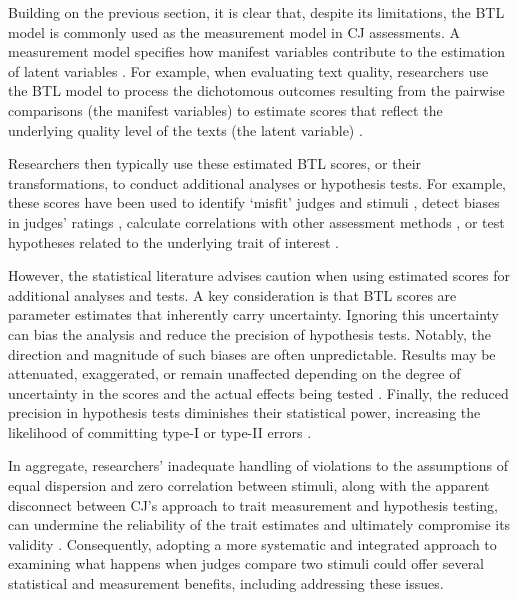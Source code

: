 \documentclass[
  authoryear,
  preprint,
  1p]{elsarticle}
\begin{document}
Building on the previous section, it is clear that, despite its
limitations, the BTL model is commonly used as the measurement model in
CJ assessments. A measurement model specifies how manifest variables
contribute to the estimation of latent variables
\citep{Everitt_et_al_2010}. For example, when evaluating text quality,
researchers use the BTL model to process the dichotomous outcomes
resulting from the pairwise comparisons (the manifest variables) to
estimate scores that reflect the underlying quality level of the texts
(the latent variable)
\citep{Laming_2004, Pollitt_2012b, Whitehouse_2012, vanDaal_et_al_2016, Lesterhuis_2018_thesis, Coertjens_et_al_2017, Goossens_et_al_2018, Bouwer_et_al_2023}.

Researchers then typically use these estimated BTL scores, or their
transformations, to conduct additional analyses or hypothesis tests. For
example, these scores have been used to identify `misfit' judges and
stimuli \citep{Pollitt_2012b, vanDaal_et_al_2016, Goossens_et_al_2018},
detect biases in judges' ratings
\citep{Pollitt_et_al_2003, Pollitt_2012b}, calculate correlations with
other assessment methods \citep{Goossens_et_al_2018, Bouwer_et_al_2023},
or test hypotheses related to the underlying trait of interest
\citep{Bramley_et_al_2019, Boonen_et_al_2020, Bouwer_et_al_2023, vanDaal_et_al_2017, Jones_et_al_2019, Gijsen_et_al_2021}.

However, the statistical literature advises caution when using estimated
scores for additional analyses and tests. A key consideration is that
BTL scores are parameter estimates that inherently carry uncertainty.
Ignoring this uncertainty can bias the analysis and reduce the precision
of hypothesis tests. Notably, the direction and magnitude of such biases
are often unpredictable. Results may be attenuated, exaggerated, or
remain unaffected depending on the degree of uncertainty in the scores
and the actual effects being tested
\citetext{\citealp[pp.~25]{Kline_et_al_2023}; \citealp[pp.~137]{Hoyle_et_al_2023}}.
Finally, the reduced precision in hypothesis tests diminishes their
statistical power, increasing the likelihood of committing type-I or
type-II errors \citep{McElreath_2020}.

{In aggregate, researchers' inadequate handling of violations to the
assumptions of equal dispersion and zero correlation between stimuli,
along with the apparent disconnect between CJ's approach to trait
measurement and hypothesis testing, can undermine the reliability of the
trait estimates and ultimately compromise its validity
\citep[pp.~2]{Perron_et_al_2015}. Consequently, adopting a more
systematic and integrated approach to examining what happens when judges
compare two stimuli could offer several statistical and measurement
benefits, including addressing these issues.}
\end{document}

